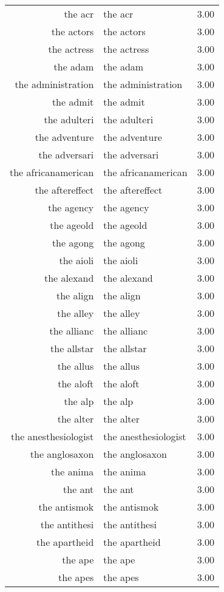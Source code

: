 \begin{table}[ht]
\begin{tabular}{rlr}
  the acr & the acr & 3.00 \\ 
  the actors & the actors & 3.00 \\ 
  the actress & the actress & 3.00 \\ 
  the adam & the adam & 3.00 \\ 
  the administration & the administration & 3.00 \\ 
  the admit & the admit & 3.00 \\ 
  the adulteri & the adulteri & 3.00 \\ 
  the adventure & the adventure & 3.00 \\ 
  the adversari & the adversari & 3.00 \\ 
  the africanamerican & the africanamerican & 3.00 \\ 
  the aftereffect & the aftereffect & 3.00 \\ 
  the agency & the agency & 3.00 \\ 
  the ageold & the ageold & 3.00 \\ 
  the agong & the agong & 3.00 \\ 
  the aioli & the aioli & 3.00 \\ 
  the alexand & the alexand & 3.00 \\ 
  the align & the align & 3.00 \\ 
  the alley & the alley & 3.00 \\ 
  the allianc & the allianc & 3.00 \\ 
  the allstar & the allstar & 3.00 \\ 
  the allus & the allus & 3.00 \\ 
  the aloft & the aloft & 3.00 \\ 
  the alp & the alp & 3.00 \\ 
  the alter & the alter & 3.00 \\ 
  the anesthesiologist & the anesthesiologist & 3.00 \\ 
  the anglosaxon & the anglosaxon & 3.00 \\ 
  the anima & the anima & 3.00 \\ 
  the ant & the ant & 3.00 \\ 
  the antismok & the antismok & 3.00 \\ 
  the antithesi & the antithesi & 3.00 \\ 
  the apartheid & the apartheid & 3.00 \\ 
  the ape & the ape & 3.00 \\ 
  the apes & the apes & 3.00 \\ 

\end{tabular}
\end{table}
